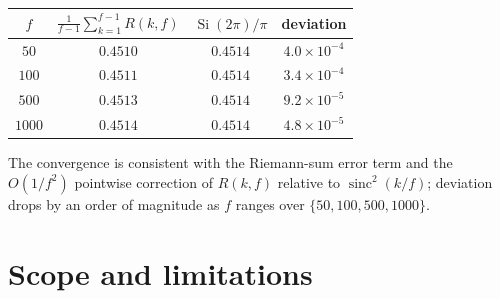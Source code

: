 \documentclass[11pt,reqno]{amsart}
\theoremstyle{plain}
\theoremstyle{definition}
\theoremstyle{remark}
\DeclareMathOperator{\sinc}{sinc}
\DeclareMathOperator{\Si}{Si}
\begin{document}
\begin{center}
\begin{tabular}{c|c|c|c}
\toprule
$f$ & $\frac{1}{f-1}\sum_{k=1}^{f-1} R(k,f)$ & $\Si(2\pi)/\pi$ & deviation \\
\midrule
$50$   & $0.4510$ & $0.4514$ & $4.0 \times 10^{-4}$ \\
$100$  & $0.4511$ & $0.4514$ & $3.4 \times 10^{-4}$ \\
$500$  & $0.4513$ & $0.4514$ & $9.2 \times 10^{-5}$ \\
$1000$ & $0.4514$ & $0.4514$ & $4.8 \times 10^{-5}$ \\
\bottomrule
\end{tabular}
\end{center}

The convergence is consistent with the Riemann-sum error term and the
$O(1/f^{2})$ pointwise correction of $R(k, f)$ relative to
$\sinc^{2}(k/f)$; deviation drops by an order of magnitude as $f$
ranges over $\{50, 100, 500, 1000\}$.

\section{Scope and limitations}\label{sec:scope}
\end{document}
